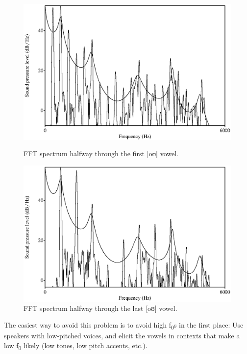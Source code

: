 \documentclass[12pt, letterpaper]{article}
\begin{document}
\begin{figure}[h!]
\centering
\begin{minipage}[t]{0.48\linewidth}
    \centering
    \includegraphics[width=\linewidth]{figs/sooprano_do.eps}
    \caption{FFT spectrum halfway through the first [oʊ] vowel.}
    \label{fig:soprano_left}
\end{minipage}
\hfill
\begin{minipage}[t]{0.48\linewidth}
    \centering
    \includegraphics[width=\linewidth]{figs/soprano_do2.eps}
    \caption{FFT spectrum halfway through the last [oʊ] vowel.}
    \label{fig:soprano_right}
\end{minipage}
\end{figure}

The easiest way to avoid this problem is to avoid high f\textsubscript{0}s in the first place: Use speakers with low-pitched voices, and elicit the vowels in contexts that make a low f\textsubscript{0} likely (low tones, low pitch accents, etc.).
\end{document}
